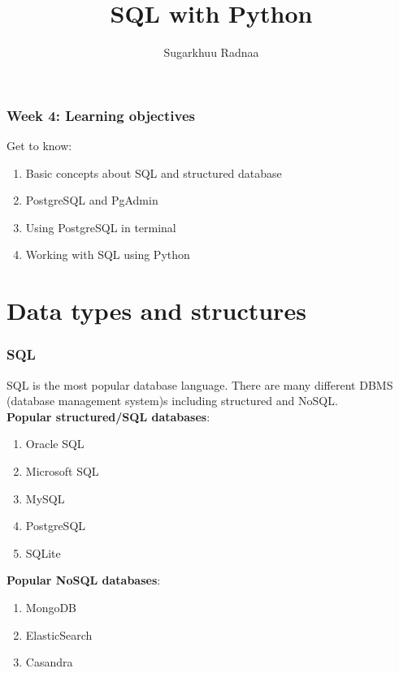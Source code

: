 \documentclass{beamer}
\title[Introduction to Python]{SQL with Python}
\author{Sugarkhuu Radnaa}
\institute[]
{
Py4Econ in Ulaanbaatar \\ 
\medskip
\textit{py4econ@gmail.com} 
}
\date{}  %
\begin{document}
\begin{frame}
\titlepage %
\end{frame}

\begin{frame}
    \frametitle{Week 4: Learning objectives}
    Get to know: 
    \begin{enumerate}
        \item Basic concepts about SQL and structured database
        \item PostgreSQL and PgAdmin
        \item Using PostgreSQL in terminal
        \item Working with SQL using Python
    \end{enumerate}
\end{frame}

\section{Data types and structures} 

\begin{frame}
    \frametitle{SQL}
    SQL is the most popular database language. There are many different DBMS (database management system)s including structured and NoSQL. \\
    \textbf{Popular structured/SQL databases}:
    \begin{enumerate}
        \item Oracle SQL
        \item Microsoft SQL
        \item MySQL
        \item PostgreSQL
        \item SQLite
    \end{enumerate}    

    \textbf{Popular NoSQL databases}:
    \begin{enumerate}
        \item MongoDB
        \item ElasticSearch
        \item Casandra
    \end{enumerate}    
\end{frame}
\end{document}
